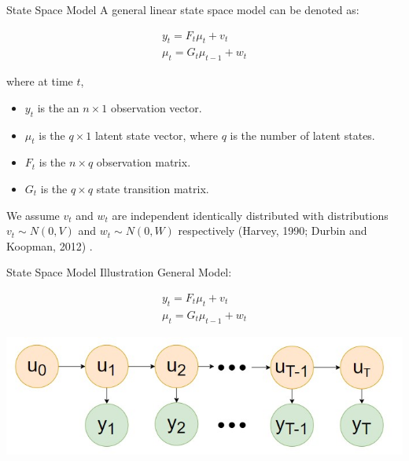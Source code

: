 \documentclass[
  ignorenonframetext,
]{beamer}
\providecommand{\tightlist}{%
  \setlength{\itemsep}{0pt}\setlength{\parskip}{0pt}}
\begin{document}
\begin{frame}{State Space Model}
\protect\hypertarget{state-space-model}{}
A general linear state space model can be denoted as:

\begin{align*}
y_t = F_t\mu_t + v_t\\
\mu_t = G_t\mu_{t-1} + w_t
\end{align*}

where at time \(t\),

\begin{itemize}
\tightlist
\item
  \(y_t\) is the an \(n \times 1\) observation vector.
\item
  \(\mu_t\) is the \(q \times 1\) latent state vector, where \(q\) is
  the number of latent states.
\item
  \(F_t\) is the \(n \times q\) observation matrix.
\item
  \(G_t\) is the \(q \times q\) state transition matrix.
\end{itemize}

We assume \(v_t\) and \(w_t\) are independent identically distributed
with distributions \(v_t \sim N(0, V)\) and \(w_t \sim N(0,W)\)
respectively (Harvey, 1990; Durbin and Koopman, 2012) .
\end{frame}

\begin{frame}{State Space Model Illustration}
\protect\hypertarget{state-space-model-illustration}{}
General Model:

\begin{align*}
y_t = F_t\mu_t + v_t\\
\mu_t = G_t\mu_{t-1} + w_t
\end{align*}

\includegraphics{images/hmm.jpg}
\end{frame}
\end{document}
